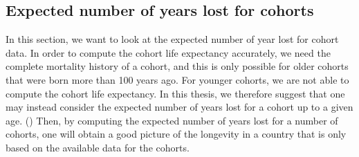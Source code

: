        
       
       


            
            
\subsection{Expected number of years lost for cohorts}         


In this section, we want to look at the expected number of year lost for cohort data.     
In order to compute the cohort life expectancy accurately, we need the complete mortality history of a cohort, and this is only possible for older cohorts that were born more than 100 years ago. For younger cohorts, we are not able to compute the cohort life expectancy.
In this thesis, we therefore suggest that one may instead consider the expected number of years lost for a cohort up to a given age. (\cite{A13}) 
Then, by computing the expected number of years lost for a number of cohorts, one will obtain a good picture of the longevity in a country that is only based on the available data
for the cohorts.



